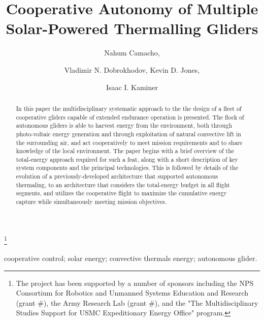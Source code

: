 \documentclass{ifacconf}
\begin{document}
\begin{frontmatter}

\title{Cooperative Autonomy of Multiple Solar-Powered Thermalling Gliders }

\thanks[footnoteinfo]{The project has been supported by a number of sponsors including the NPS Consortium for Robotics and Unmanned Systems Education and Research (grant $\#$), the Army Research Lab (grant $\#$), and the "The Multidisciplinary Studies Support for USMC Expeditionary Energy Office" program.}

\author[First]{Nahum Camacho,}
\author[Second]{Vladimir N. Dobrokhodov, Kevin D. Jones,}
\author[Third]{Isaac I. Kaminer}

\address[First]{Graduate student at the Department  of Mechanical and Aerospace Engineering, Naval Postgraduate School, Monterey, CA 93943 USA (e-mail: ncamacho@nps.edu)}
\address[Second]{Research Associate Professors at the Department  of Mechanical and Aerospace Engineering, Naval Postgraduate School, Monterey, CA 93943 USA (e-mail: {vndobrok, kdjones}@nps.edu)}
\address[Third]{Professor at the Department  of Mechanical and Aerospace Engineering, Naval Postgraduate School, Monterey, CA 93943 USA (e-mail: kaminer@nps.edu)}


\begin{keyword}                           %
cooperative control; solar energy; convective thermals energy; autonomous glider.
\end{keyword}                             %


\begin{abstract}                          %
In this paper the multidisciplinary systematic approach to the the design of a fleet of cooperative gliders capable of extended endurance operation is presented. The flock of autonomous gliders is able to harvest energy from the environment, both through photo-voltaic energy generation and through exploitation of natural convective lift in the surrounding air, and act cooperatively to meet mission requirements and to share knowledge of the local environment. The paper begins with a brief overview of the total-energy approach required for such a feat, along with a short description of key system components and the principal technologies. This is followed by details of the evolution of a previously-developed architecture that supported autonomous thermaling, to an architecture that considers the total-energy budget in all flight segments, and utilizes the cooperative flight to maximize the cumulative energy capture while simultaneously meeting mission objectives.
\end{abstract}

\end{frontmatter}
\end{document}
